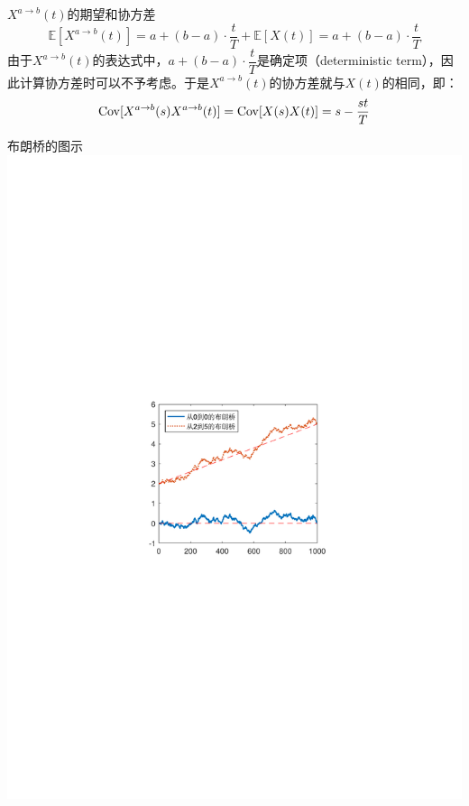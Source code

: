 \documentclass[t]{beamer}
\newcommand{\E}{\mathbb{E}}
\newcommand{\Cov}{{\rm Cov}}
\begin{document}
\begin{frame}{$X^{a\to b}(t)$的期望和协方差}
  \begin{equation*}
    \E[X^{a\to b}(t)]=a+(b-a)\cdot \frac{t}{T}+\E[X(t)]=a+(b-a)\cdot \frac{t}{T}
    \end{equation*}
    由于$X^{a\to b}(t)$的表达式中，$a+(b-a)\cdot \dfrac{t}{T}$是确定项（deterministic term），因此计算协方差时可以不予考虑。于是$X^{a\to b}(t)$的协方差就与$X(t)$的相同，即：
    \begin{equation*}
    \Cov[X^{a\to b}(s)X^{a\to b}(t)]=\Cov[X(s)X(t)]=s-\frac{st}{T}
    \end{equation*}
\end{frame}


\begin{frame}{布朗桥的图示}
  \centering
	\includegraphics[scale=1]{fig/bb1.pdf}
\end{frame}
\end{document}

